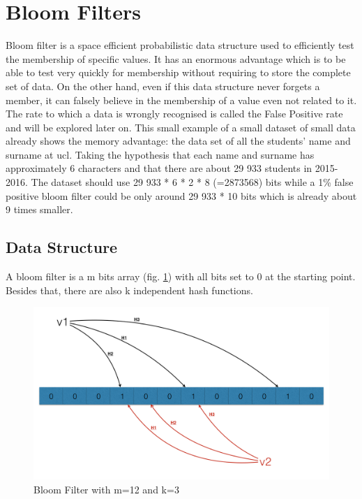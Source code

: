 \documentclass{eplmastersthesis}
\begin{document}
\section{Bloom Filters}
Bloom filter \cite{bloom1970space} is a space efficient probabilistic data structure  used to efficiently test the membership of specific values.
It has an enormous advantage which is to be able to test very quickly for membership without requiring to store the complete set of data. On the other hand, even if this data structure never forgets a member, it can falsely believe in the membership of a value even not related to it. The rate to which a data is wrongly recognised is called the False Positive rate and will be explored later on.
This small example of a small dataset of small data already shows the memory advantage: the data set of all the students' name and surname at \gls{ucl}. Taking the hypothesis that each name and surname has approximately 6 characters and that there are about 29 933 students in 2015-2016. The dataset should use 29 933 * 6 * 2 * 8 (=2873568) bits while a 1\% false positive bloom filter could be only around 29 933 * 10 bits which is already about 9 times smaller.\\

\subsection{Data Structure}
A bloom filter is a m bits array (fig. \ref{bloom-1}) with all bits set to 0 at the starting point. Besides that, there are also k independent hash functions. 

\begin{figure}[h!]
	\begin{center}
		\includegraphics[scale=0.3]{res/bloom-1}
		\caption{Bloom Filter with m=12 and k=3}
		\label{bloom-1}
	\end{center}
\end{figure}
\end{document}
